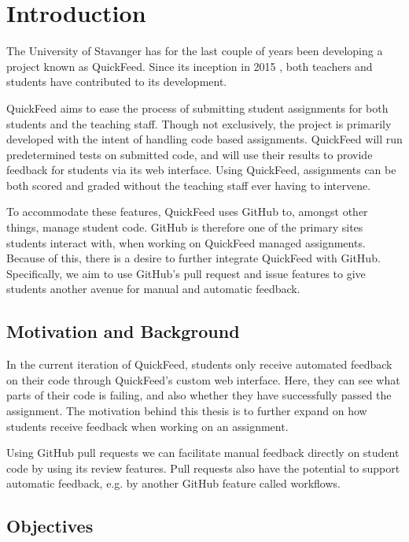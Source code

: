 
\chapter{Introduction}
\label{ch:intro}

The University of Stavanger has for the last couple of years been developing a project known as QuickFeed.
Since its inception in 2015 \cite{autograder}, both teachers and students have contributed to its development. %

QuickFeed aims to ease the process of submitting student assignments for both students and the teaching staff.
Though not exclusively, the project is primarily developed with the intent of handling code based assignments.
QuickFeed will run predetermined tests on submitted code, and will use their results to provide feedback for students via its web interface.
Using QuickFeed, assignments can be both scored and graded without the teaching staff ever having to intervene.

To accommodate these features, QuickFeed uses GitHub to, amongst other things, manage student code.
GitHub is therefore one of the primary sites students interact with, when working on QuickFeed managed assignments.
Because of this, there is a desire to further integrate QuickFeed with GitHub.
Specifically, we aim to use GitHub's pull request and issue features to give students another avenue for manual and automatic feedback.

\section{Motivation and Background}
\label{sec:motivation}

In the current iteration of QuickFeed, students only receive automated feedback on their code through QuickFeed's custom web interface.
Here, they can see what parts of their code is failing, and also whether they have successfully passed the assignment.
The motivation behind this thesis is to further expand on how students receive feedback when working on an assignment.

Using GitHub pull requests we can facilitate manual feedback directly on student code by using its review features.
Pull requests also have the potential to support automatic feedback, e.g. by another GitHub feature called workflows.

\section{Objectives}

